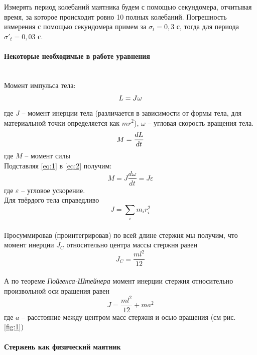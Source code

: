 \documentclass[a4paper,12pt]{article}
\begin{document}
	\noindent
	Измерять период колебаний маятника будем с помощью секундомера, отчитывая время, за которое происходит ровно 10 полных колебаний. Погрешность измерения с помощью секундомера примем за $\sigma_t=0,3$ с, тогда для периода $\sigma'_t=0,03$ с. 
	\paragraph{Некоторые необходимые в работе уравнения}\mbox{}\\
	Момент импульса тела:
	\begin{equation}\label{eq:1}
		\centering
		L=J\omega
	\end{equation}
	где $J$ -- момент инерции тела (различается в зависимости от формы тела, для материальной точки определяется как $mr^2$),
	$\omega$ -- угловая скорость вращения тела.
	\begin{equation}\label{eq:2}
		\centering
		M=\frac{dL}{dt}
	\end{equation}
	где $M$ -- момент силы\\
	\noindent
	Подставляя \eqref{eq:1} в \eqref{eq:2} получим:
	\begin{equation}
		\label{eq:3}
		M=J\frac{d\omega}{dt}=J\varepsilon
	\end{equation}
	где $\varepsilon$ -- угловое ускорение.\\
	\noindent
	Для твёрдого тела справедливо
	\begin{equation}
		\label{eq:4}
		J=\sum_i{m_ir_i^2}
	\end{equation}\mbox{}\\
	\noindent
	Просуммировав (проинтегрировав) по всей длине стержня мы получим, что момент инерции $J_C$ относительно центра массы стержня равен
	\begin{equation}
		\label{eq:5}
		J_C=\frac{ml^2}{12}
	\end{equation}\mbox{}\\
	\noindent
	А по теореме \textit{Гюйгенса-Штейнера} момент инерции стержня относительно произвольной оси вращения равен
	\begin{equation}
		\label{eq:6}
		J=\frac{ml^2}{12}+ma^2
	\end{equation}
	где $a$ -- расстояние между центром масс стержня и осью вращения (см рис. \ref{fig:1})
	
	\paragraph{Стержень как физический маятник}
	
\end{document}

